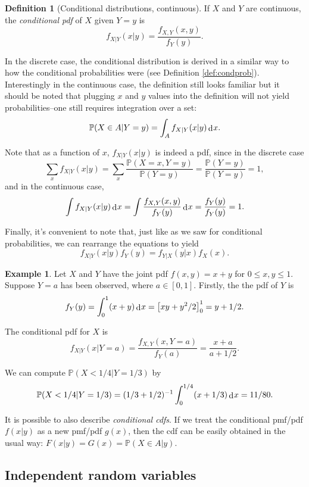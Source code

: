 \documentclass[
]{book}
\newcommand{\bbP}{\mathbb{P}}
\DeclareMathOperator{\dd}{d}
\newcommand{\dint}{\dd\hspace{0.5pt}\!}
\theoremstyle{definition}
\newtheorem{definition}{Definition}[chapter]
\theoremstyle{definition}
\newtheorem{example}{Example}[chapter]
\theoremstyle{definition}
\theoremstyle{definition}
\theoremstyle{remark}
\begin{document}
\begin{definition}[Conditional distributions, continuous]
If \(X\) and \(Y\) are continuous, the \emph{conditional pdf} of \(X\) given \(Y=y\) is
\[
  f_{X|Y}(x|y) =  \frac{f_{X,Y}(x, y)}{f_Y(y)}.
\]
\end{definition}

In the discrete case, the conditional distribution is derived in a similar way to how the conditional probabilities were (see Definition \ref{def:condprob}).
Interestingly in the continuous case, the definition still looks familiar but it should be noted that plugging \(x\) and \(y\) values into the definition will not yield probabilities--one still requires integration over a set:
\[
\bbP(X \in A|Y=y) = \int_A f_{X|Y}(x|y) \dint x. 
\]

Note that as a function of \(x\), \(f_{X|Y}(x|y)\) is indeed a pdf, since in the discrete case
\[
\sum_x f_{X|Y}(x|y) = \sum_x \frac{\bbP(X=x, Y=y)}{\bbP(Y=y)} = \frac{\bbP(Y=y)}{\bbP(Y=y)} = 1,
\]
and in the continuous case,
\[
\int f_{X|Y}(x|y) \dint x = \int \frac{f_{X,Y}(x, y)}{f_Y(y)} \dint x = \frac{f_Y(y)}{f_Y(y)} = 1.
\]

Finally, it's convenient to note that, just like as we saw for conditional probabilities, we can rearrange the equations to yield \[f_{X|Y}(x|y)f_Y(y)=f_{Y|X}(y|x)f_X(x).\]

\begin{example}
Let \(X\) and \(Y\) have the joint pdf \(f(x,y)=x+y\) for \(0\leq x,y\leq 1\).
Suppose \(Y=a\) has been observed, where \(a\in[0,1]\).
Firstly, the the pdf of \(Y\) is
\[
f_Y(y) = \int_0^1 (x+y) \dint x = \left[xy +y^2/2\right]_0^1 = y + 1/2.
\]

The conditional pdf for \(X\) is
\[
f_{X|Y}(x|Y=a) = \frac{f_{X,Y}(x,Y=a)}{f_Y(a)} = \frac{x+a}{a + 1/2}.
\]

We can compute \(\bbP(X<1/4|Y=1/3)\) by
\begin{align*}
\bbP(X<1/4|Y=1/3) = (1/3 + 1/2)^{-1} \int_{0}^{1/4} (x+1/3) \dint x = 11/80.
\end{align*}
\end{example}

It is possible to also describe \emph{conditional cdfs}.
If we treat the conditional pmf/pdf \(f(x|y)\) as a new pmf/pdf \(g(x)\), then the cdf can be easily obtained in the usual way: \(F(x|y)=G(x)=\bbP(X\in A|y)\).

\hypertarget{independent-random-variables}{%
\subsection{Independent random variables}\label{independent-random-variables}}
\end{document}
